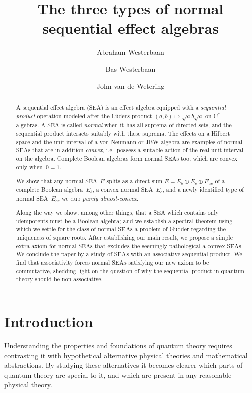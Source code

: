 \documentclass[a4paper, onecolumn, accepted=2020-12-22]{quantumarticle}
\title{The three types of normal sequential effect algebras}
\author{Abraham Westerbaan}
\affiliation{Radboud Universiteit Nijmegen}
\author{Bas Westerbaan}
\affiliation{Radboud Universiteit Nijmegen}
\affiliation{University College London}
\author{John van de Wetering}
\affiliation{Radboud Universiteit Nijmegen}
\theoremstyle{definition}
\begin{document}
\maketitle

\begin{abstract}
	A sequential effect algebra (SEA) is an effect algebra equipped with a \emph{sequential product} operation modeled after the L\"uders product $(a,b)\mapsto \sqrt{a}b\sqrt{a}$ on C$^*$-algebras.
    A SEA is called \emph{normal}
    when
    it has all suprema of directed sets,
    and the sequential product interacts suitably with these suprema.
The effects on a Hilbert space
    and the unit interval of a von Neumann or JBW algebra
    are examples of normal SEAs
    that are in addition \emph{convex}, i.e.~possess a
    suitable action of the real unit interval on the algebra.
    Complete Boolean algebras form normal SEAs too,
    which are convex only when~$0=1$.

We show that any normal SEA~$E$
    splits as a direct sum $E= E_b\oplus E_c \oplus E_{ac}$
    of a complete Boolean algebra~$E_b$,
    a convex normal SEA~$E_c$,
    and a newly identified type of normal SEA~$E_{ac}$
    we dub \emph{purely almost-convex}.

Along the way we show, among other things,
that a SEA which contains only idempotents
must be a Boolean algebra;
and we establish a spectral theorem
using which we settle for the class of normal SEAs
a problem of Gudder regarding the uniqueness of square roots.
After establishing our main result,
    we propose a simple extra axiom for normal SEAs that
    excludes the seemingly pathological
    a-convex SEAs.
We conclude the paper by a study of
    SEAs with an associative sequential product.
We find that associativity forces normal SEAs satisfying our new
    axiom to be commutative, shedding light on the question of why the
    sequential product in quantum theory should be non-associative.
\end{abstract}

\section{Introduction}

Understanding the properties and foundations of quantum theory requires contrasting it with hypothetical alternative physical theories and mathematical abstractions. By studying these alternatives it becomes clearer which parts of quantum theory are special to it, and which are present in any reasonable physical theory.
\end{document}
